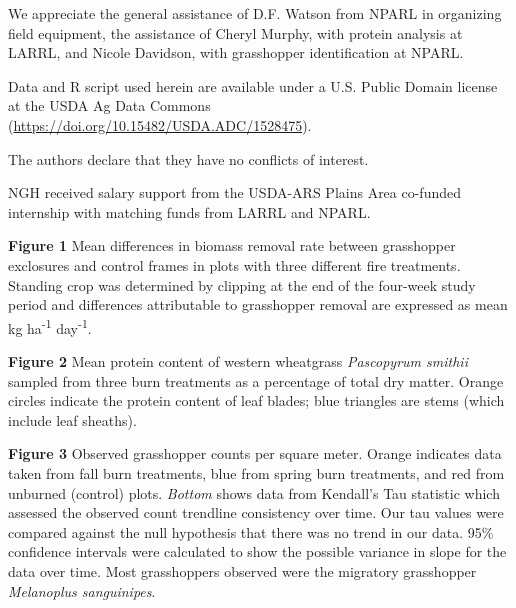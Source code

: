 \documentclass[referee, 
	            sn-basic]
           {sn-jnl}
\begin{document}

We appreciate the general assistance of D.F. Watson from NPARL in organizing field equipment, the assistance of Cheryl Murphy, with protein analysis at LARRL, and Nicole Davidson, with grasshopper identification at NPARL. 


Data and \textsf{R} script used herein are available under a U.S. Public Domain license at the USDA Ag Data Commons (\href{doi.org/10.15482/USDA.ADC/1528475}{https://doi.org/10.15482/USDA.ADC/1528475}).



The authors declare that they have no conflicts of interest.


NGH received salary support from the USDA-ARS Plains Area co-funded internship with matching funds from LARRL and NPARL. 



\newpage 

\textbf{Figure 1} Mean differences in biomass removal rate between grasshopper exclosures and control frames in plots with three different fire treatments. 
		Standing crop was determined by clipping at the end of the four-week study period and differences attributable to grasshopper removal are expressed as mean kg ha\textsuperscript{-1} day\textsuperscript{-1}. 

\textbf{Figure 2} Mean protein content of western wheatgrass \emph{Pascopyrum smithii} sampled from three burn treatments as a percentage of total dry matter. 
Orange circles indicate the protein content of leaf blades; blue triangles are stems (which include leaf sheaths).

\textbf{Figure 3} Observed grasshopper counts per square meter. 
Orange indicates data taken from fall burn treatments, blue from spring burn treatments, and red from unburned (control) plots.
\emph{Bottom} shows data from Kendall's Tau statistic which assessed the observed count trendline consistency over time. 
Our tau values were compared against the null hypothesis that there was no trend in our data. 
95\% confidence intervals were calculated to show the possible variance in slope for the data over time. 
Most grasshoppers observed were the migratory grasshopper \emph{Melanoplus sanguinipes}.



\newpage		
\end{document}
